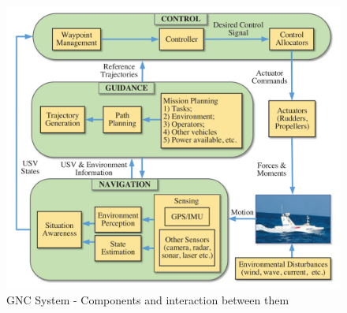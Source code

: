     \begin{figure}[H]
        \centering
        \includegraphics[scale=0.7]{figs/Liu2016Unmanned_GNCSystem.png}
        \caption{\ac{GNC} System - Components and interaction between them \cite{Liu2016Unmanned}}
        \label{fig:Liu2016Unmanned_GNCSystem}
    \end{figure}
    
    
        
        
        
